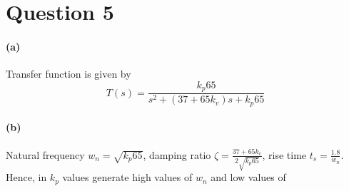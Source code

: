 \section{Question 5}
\paragraph{(a)} Transfer function is given by
\begin{equation}
T(s) = \frac{k_p 65}{s^2 + (37+65 k_v)s + k_p 65}
\end{equation}

\paragraph{(b)} Natural frequency $w_n=\sqrt{k_p 65}$, damping ratio $\zeta=\frac{37+65 k_v}{2\sqrt{k_p 65}}$, rise time $t_s = \frac{1.8}{w_n}$. Hence, in  $k_p$ values generate high values of $w_n$ and low values of $$ 












